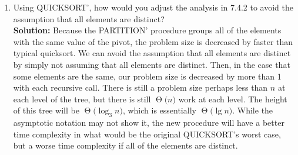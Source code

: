 \documentclass[11pts]{article}
\newcommand{\BigTheta}[1]{\ensuremath{\operatorname{\Theta}\bigl(#1\bigr)}}
\begin{document}
\begin{enumerate}
\begin{enumerate}
  \textbf{Solution:}
  \begin{algorithm}{RANDOMIZED-QUICKSORT'}[ A( 0 \dots n-1 ), p, r ]{
     }
   \\
    q, t = (A, p , r) \\
    RANDOMIZED-QUICKSORT'(A, p, q-1) \\
    RANDOMIZED-QUICKSORT'(A, t+1, r) \\
  \qfi
  \end{algorithm}

\newpage
  \begin{algorithm}{QUICKSORT'}[ A( 0 \dots n-1 ), p, r ]{
     }
   \\
    q, t = (A, p , r)  \\
    RANDOMIZED-QUICKSORT'(A, p, q-1) \\
    RANDOMIZED-QUICKSORT'(A, t+1, r) \\
  \qfi 
  \end{algorithm}

  \item Using QUICKSORT', how would you adjust the analysis in 7.4.2
        to avoid the assumption that all elements are distinct? \\

  \textbf{Solution:} Because the PARTITION' procedure groups all of the
  elements with the same value of the pivot, the problem size is decreased
  by faster than typical quicksort. We can avoid the assumption that all
  elements are distinct by simply not assuming that all elements are
  distinct. Then, in the case that some elements are the same, our problem size
  is decreased by more than 1 with each recursive call. There is still
  a problem size perhaps less than $n$ at each level of the tree, but there is
  still \BigTheta{n} work at each level. The height of this tree will be
  \BigTheta{\log_{3}{n}}, which is essentially \BigTheta{\lg{n}}. While the
  asymptotic notation may not show it, the new procedure will have a better
  time complexity in what would be the original QUICKSORT's worst case,
  but a worse time complexity if all of the elements are distinct.

  \end{enumerate}

\end{enumerate}
\end{document}
